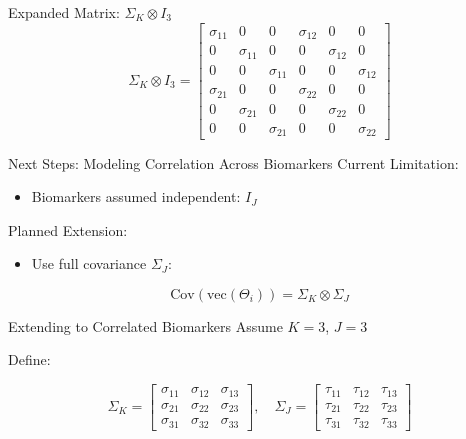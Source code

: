 \documentclass[
  ignorenonframetext,
]{beamer}
\providecommand{\tightlist}{%
  \setlength{\itemsep}{0pt}\setlength{\parskip}{0pt}}\usepackage{longtable,booktabs,array}
\begin{document}
\begin{frame}{Expanded Matrix: \(\Sigma_K \otimes I_3\)}
\label{expanded-matrix-sigma_k-otimes-i_3}
\[
\Sigma_K \otimes I_3 =
\begin{bmatrix}
\sigma_{11} & 0 & 0 & \sigma_{12} & 0 & 0 \\
0 & \sigma_{11} & 0 & 0 & \sigma_{12} & 0 \\
0 & 0 & \sigma_{11} & 0 & 0 & \sigma_{12} \\
\sigma_{21} & 0 & 0 & \sigma_{22} & 0 & 0 \\
0 & \sigma_{21} & 0 & 0 & \sigma_{22} & 0 \\
0 & 0 & \sigma_{21} & 0 & 0 & \sigma_{22}
\end{bmatrix}
\]
\end{frame}

\begin{frame}{Next Steps: Modeling Correlation Across Biomarkers}
\label{next-steps-modeling-correlation-across-biomarkers}
Current Limitation:

\begin{itemize}
\tightlist
\item
  Biomarkers assumed independent: \(I_J\)
\end{itemize}

Planned Extension:

\begin{itemize}
\tightlist
\item
  Use full covariance \(\Sigma_J\):
\end{itemize}

\[
\text{Cov}(\text{vec}(\Theta_i)) = \Sigma_K \otimes \Sigma_J
\]
\end{frame}

\begin{frame}{Extending to Correlated Biomarkers}
\label{extending-to-correlated-biomarkers}
Assume \(K=3\), \(J=3\)

Define:

\[
\Sigma_K =
\begin{bmatrix}
\sigma_{11} & \sigma_{12} & \sigma_{13} \\
\sigma_{21} & \sigma_{22} & \sigma_{23} \\
\sigma_{31} & \sigma_{32} & \sigma_{33}
\end{bmatrix},\quad
\Sigma_J =
\begin{bmatrix}
\tau_{11} & \tau_{12} & \tau_{13} \\
\tau_{21} & \tau_{22} & \tau_{23} \\
\tau_{31} & \tau_{32} & \tau_{33}
\end{bmatrix}
\]
\end{frame}
\end{document}

